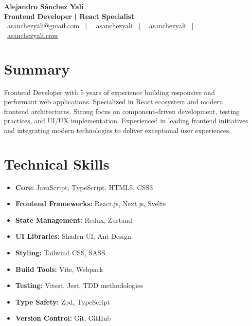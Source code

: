\documentclass[letterpaper,11pt]{article}
\begin{document}
\begin{center}
\textbf{\Huge Alejandro Sánchez Yalí}\\[0.3em]
\textbf{\Large Frontend Developer | React Specialist}\\[0.5em]
\small
\faEnvelope\ \href{mailto:asanchezyali@gmail.com}{asanchezyali@gmail.com}  ~|~
\faLinkedin\ \href{https://www.linkedin.com/in/asanchezyali}{asanchezyali} ~|~
\faGithub\ \href{https://github.com/asanchezyali}{asanchezyali}  ~|~
\faGlobe\ \href{https://asanchezyali.com}{asanchezyali.com}
\end{center}

\section{Summary}
Frontend Developer with 5 years of experience building responsive and performant web applications. Specialized in React ecosystem and modern frontend architectures. Strong focus on component-driven development, testing practices, and UI/UX implementation. Experienced in leading frontend initiatives and integrating modern technologies to deliver exceptional user experiences.

\section{Technical Skills}
\begin{itemize}[leftmargin=*]
  \item \textbf{Core:} JavaScript, TypeScript, HTML5, CSS3
  \item \textbf{Frontend Frameworks:} React.js, Next.js, Svelte
  \item \textbf{State Management:} Redux, Zustand
  \item \textbf{UI Libraries:} Shadcn UI, Ant Design
  \item \textbf{Styling:} Tailwind CSS, SASS
  \item \textbf{Build Tools:} Vite, Webpack
  \item \textbf{Testing:} Vitest, Jest, TDD methodologies
  \item \textbf{Type Safety:} Zod, TypeScript
  \item \textbf{Version Control:} Git, GitHub
\end{itemize}
\end{document}
